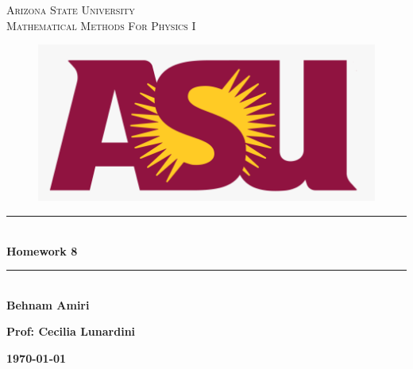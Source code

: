 \documentclass[fleqn]{article}
\begin{document}
  \begin{titlepage}

    \newcommand{\HRule}{\rule{\linewidth}{0.5mm}} %

    \center %
    


    \textsc{\LARGE Arizona State University}\\[1.5cm] %

    \textsc{\LARGE Mathematical Methods For Physics I }\\[1.5cm] %


    \begin{figure}
      \includegraphics[width=\linewidth]{asu.png}
    \end{figure}


    \HRule \\[0.4cm]
    { \huge \bfseries Homework 8}\\[0.4cm] 
    \HRule \\[1.5cm]
    
    \textbf{Behnam Amiri}

    \bigbreak

    \textbf{Prof: Cecilia Lunardini}

    \bigbreak


    \textbf{{\large \today}\\[2cm]}

    \vfill %

  \end{titlepage}
\end{document}
